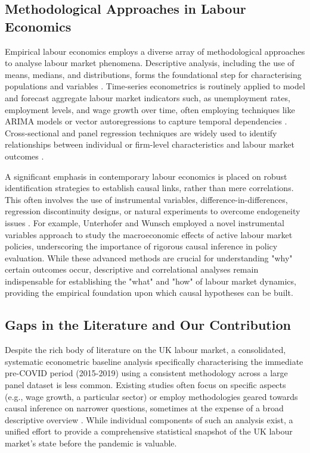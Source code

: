 \documentclass[11pt,a4paper]{article}
\begin{document}
\subsection{Methodological Approaches in Labour Economics}

Empirical labour economics employs a diverse array of methodological approaches to analyse labour market phenomena. Descriptive analysis, including the use of means, medians, and distributions, forms the foundational step for characterising populations and variables \cite{ref4}. Time-series econometrics is routinely applied to model and forecast aggregate labour market indicators such, as unemployment rates, employment levels, and wage growth over time, often employing techniques like ARIMA models or vector autoregressions to capture temporal dependencies \cite{ref4}. Cross-sectional and panel regression techniques are widely used to identify relationships between individual or firm-level characteristics and labour market outcomes \cite{ref2}.

A significant emphasis in contemporary labour economics is placed on robust identification strategies to establish causal links, rather than mere correlations. This often involves the use of instrumental variables, difference-in-differences, regression discontinuity designs, or natural experiments to overcome endogeneity issues \cite{ref2}. For example, Unterhofer and Wunsch \cite{ref2} employed a novel instrumental variables approach to study the macroeconomic effects of active labour market policies, underscoring the importance of rigorous causal inference in policy evaluation. While these advanced methods are crucial for understanding "why" certain outcomes occur, descriptive and correlational analyses remain indispensable for establishing the "what" and "how" of labour market dynamics, providing the empirical foundation upon which causal hypotheses can be built.

\subsection{Gaps in the Literature and Our Contribution}

Despite the rich body of literature on the UK labour market, a consolidated, systematic econometric baseline analysis specifically characterising the immediate pre-COVID period (2015-2019) using a consistent methodology across a large panel dataset is less common. Existing studies often focus on specific aspects (e.g., wage growth, a particular sector) or employ methodologies geared towards causal inference on narrower questions, sometimes at the expense of a broad descriptive overview \cite{ref1, ref5, ref6}. While individual components of such an analysis exist, a unified effort to provide a comprehensive statistical snapshot of the UK labour market's state before the pandemic is valuable.
\end{document}
